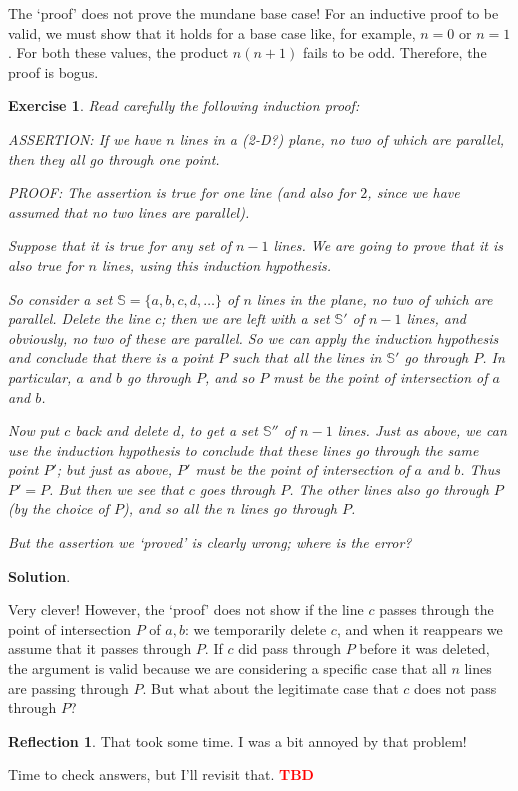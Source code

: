 \documentclass[11pt]{book}
\theoremstyle{definition}
\theoremstyle{plain}
\newtheorem{exercise}{Exercise}
\theoremstyle{definition}
\theoremstyle{problemstyle}
\theoremstyle{remark}
\theoremstyle{definition}
\newtheorem{reflection}{Reflection}
\newcommand{\tbd}{
    \vspace{5mm}
    \textbf{\textcolor{red}{\Large{TBD}}}
    \vspace{5mm}
}
\begin{document}
The `proof' does not prove the mundane base case! For an inductive proof to be valid, we must show that it holds for a base case like, for example, $n=0$ or $n=1$. For both these values, the product $n(n+1)$ fails to be odd. Therefore, the proof is bogus.
\begin{exercise}
    \label{ex:2.1.13}
Read carefully the following induction proof:

    ASSERTION: If we have $n$ lines in a (2-D?) plane, no two of which are parallel, then they all go through one point.

PROOF: The assertion is true for one line (and also for $2$, since we
have assumed that no two lines are parallel). 

Suppose that it is true for any set of $n-1$ lines. We are going to prove that it is also true for $n$ lines, using this induction hypothesis.

    So consider a set $\mathbb{S}=\{a,b,c,d,\dots\}$ of $n$ lines in the plane, no two of which are parallel. Delete the line $c$; then we are left with a set $\mathbb{S'}$ of $n-1$ lines, and obviously, no two of these are parallel. So we can apply the induction hypothesis and conclude that there is a point $P$ such that all the lines in $\mathbb{S'}$ go through $P$. In particular, $a$ and $b$ go through $P$, and so $P$ must be the point of intersection of $a$ and $b$.

    Now put $c$ back and delete $d$, to get a set $\mathbb{S''}$ of $n-1$ lines. Just as above, we can use the induction hypothesis to conclude that these lines go through the same point $P'$; but just as above, $P'$ must be the point of intersection of $a$ and $b$. Thus $P'=P$. But then we see that $c$ goes through $P$. The other lines also go through $P$ (by the choice of $P$), and so all the $n$ lines go through $P$.  

    But the assertion we `proved' is clearly wrong; where is the error?
\end{exercise}
\textbf{Solution}.

Very clever! However, the `proof' does not show if the line $c$ passes through the point of intersection $P$ of $a,b$: we temporarily delete $c$, and when it reappears we assume that it passes through $P$. If $c$ did pass through $P$ before it was deleted, the argument is valid because we are considering a specific case that all $n$ lines are passing through $P$. But what about the legitimate case that $c$ does not pass through $P$?

\begin{reflection}
    That took some time. I was a bit annoyed by that problem!

    Time to check answers, but I'll revisit that. \tbd
\end{reflection}
\end{document}
